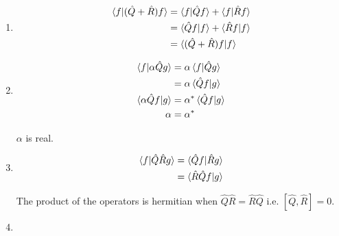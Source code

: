 \documentclass{article}
\begin{document}
\begin{enumerate}
  \item

        \begin{align*}
          \braket{f | (\hat{Q} + \hat{R}) f} & = \braket{f | \hat{Q} f} + \braket{f | \hat{R} f} \\
                                             & = \braket{\hat{Q} f | f} + \braket{\hat{R} f | f} \\
                                             & = \braket{(\hat{Q} + \hat{R}) f | f}
        \end{align*}

  \item

        \begin{align*}
          \braket{f | \alpha \hat{Q} g} & = \alpha \braket{f | \hat{Q} g}   \\
                                        & = \alpha \braket{\hat{Q} f | g}   \\
          \braket{\alpha \hat{Q} f | g} & = \alpha^* \braket{\hat{Q} f | g} \\
          \alpha                        & = \alpha^*
        \end{align*}

        $\alpha$ is real.

  \item

        \begin{align*}
          \braket{f | \hat{Q} \hat{R} g} & = \braket{\hat{Q} f | \hat{R} g} \\
                                         & = \braket{\hat{R} \hat{Q} f | g}
        \end{align*}

        The product of the operators is hermitian when $\hat{Q} \hat{R} = \hat{R} \hat{Q}$ i.e. $[\hat{Q}, \hat{R}] = 0$.

  \item


\end{enumerate}
\end{document}
